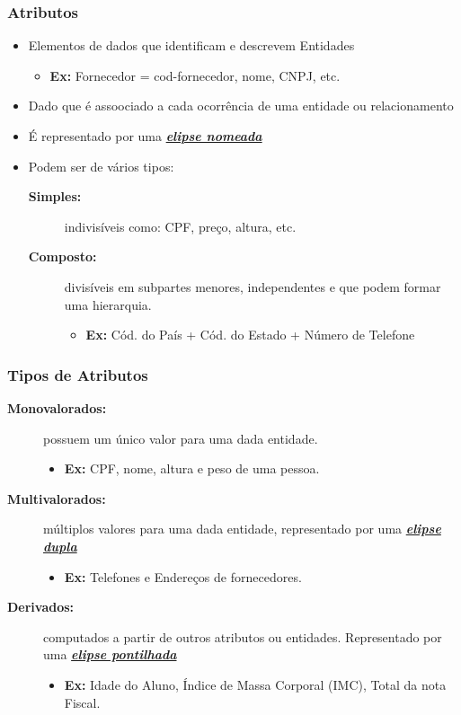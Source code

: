 \documentclass[12pt,a4paper,titlepage]{article}
\begin{document}
\subsubsection{Atributos}
\begin{itemize}
    \item Elementos de dados que identificam e descrevem Entidades
        \begin{itemize}
            \item \textbf{Ex:} Fornecedor = cod-fornecedor, nome, CNPJ, etc.
        \end{itemize}
    \item Dado que é assoociado a cada ocorrência de uma entidade ou relacionamento
    \item É representado por uma \textbf{\textit{\underline{elipse nomeada}}}
    \item Podem ser de vários tipos:
        \begin{description}
            \item[\textbf{Simples:}] indivisíveis como: CPF, preço, altura, etc.
            \item[\textbf{Composto:}] divisíveis em subpartes menores, independentes e que podem formar uma hierarquia.
                \begin{itemize}
                    \item \textbf{Ex:} Cód. do País + Cód. do Estado + Número de Telefone
                \end{itemize}
        \end{description}
\end{itemize}

\subsubsection{Tipos de Atributos}
\begin{description}
    \item[\textbf{Monovalorados:}]
        possuem um único valor para uma dada entidade.
        \begin{itemize}\item \textbf{Ex:} CPF, nome, altura e peso de uma pessoa.\end{itemize}
    \item[\textbf{Multivalorados:}]
        múltiplos valores para uma dada entidade, representado por uma \textit{\textbf{\underline{elipse dupla}}}
        \begin{itemize}
            \item \textbf{Ex:} Telefones e Endereços de fornecedores.
        \end{itemize}
    \item[\textbf{Derivados:}] computados a partir de outros atributos ou entidades. Representado por uma \textbf{\textit{\underline{elipse pontilhada}}}
        \begin{itemize}
            \item \textbf{Ex:} Idade do Aluno, Índice de Massa Corporal (IMC), Total da nota Fiscal.
        \end{itemize}
\end{description}
\end{document}
